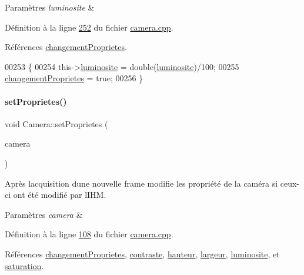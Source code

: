 \begin{DoxyParams}{Paramètres}
{\em luminosite} & \\
\hline
\end{DoxyParams}


Définition à la ligne \hyperlink{camera_8cpp_source_l00252}{252} du fichier \hyperlink{camera_8cpp_source}{camera.\+cpp}.



Références \hyperlink{camera_8h_source_l00070}{changement\+Proprietes}.


\begin{DoxyCode}
00253 \{
00254     this->\hyperlink{class_camera_aca5433bf19773161142d73009469b1ed}{luminosite} = double(\hyperlink{class_camera_aca5433bf19773161142d73009469b1ed}{luminosite})/100;
00255     \hyperlink{class_camera_a50d2b3ef5c08f8b61bbe2115d71005bd}{changementProprietes} = \textcolor{keyword}{true};
00256 \}
\end{DoxyCode}
\mbox{\label{class_camera_a77397d68d606172ccfafed5624c31213}} 
\paragraph{\texorpdfstring{set\+Proprietes()}{setProprietes()}}
{\footnotesize\ttfamily void Camera\+::set\+Proprietes (\begin{DoxyParamCaption}\item[{cv\+::\+Video\+Capture \&}]{camera }\end{DoxyParamCaption})}



Après l\textquotesingle{}acquisition d\textquotesingle{}une nouvelle frame modifie les propriété de la caméra si ceux-\/ci ont été modifié par l\textquotesingle{}I\+HM. 


\begin{DoxyParams}{Paramètres}
{\em camera} & \\
\hline
\end{DoxyParams}


Définition à la ligne \hyperlink{camera_8cpp_source_l00108}{108} du fichier \hyperlink{camera_8cpp_source}{camera.\+cpp}.



Références \hyperlink{camera_8h_source_l00070}{changement\+Proprietes}, \hyperlink{camera_8h_source_l00068}{contraste}, \hyperlink{camera_8h_source_l00066}{hauteur}, \hyperlink{camera_8h_source_l00065}{largeur}, \hyperlink{camera_8h_source_l00067}{luminosite}, et \hyperlink{camera_8h_source_l00069}{saturation}.



